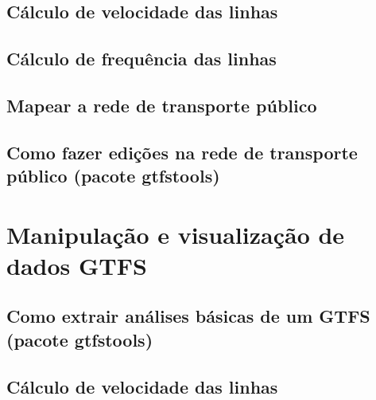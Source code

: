 \documentclass[
  letterpaper,
  DIV=11,
  numbers=noendperiod]{scrreprt}
\begin{document}
\hypertarget{cuxe1lculo-de-velocidade-das-linhas}{%
\section{Cálculo de velocidade das
linhas}\label{cuxe1lculo-de-velocidade-das-linhas}}

\hypertarget{cuxe1lculo-de-frequuxeancia-das-linhas}{%
\section{Cálculo de frequência das
linhas}\label{cuxe1lculo-de-frequuxeancia-das-linhas}}

\hypertarget{mapear-a-rede-de-transporte-puxfablico}{%
\section{Mapear a rede de transporte
público}\label{mapear-a-rede-de-transporte-puxfablico}}

\hypertarget{como-fazer-ediuxe7uxf5es-na-rede-de-transporte-puxfablico-pacote-gtfstools}{%
\section{Como fazer edições na rede de transporte público (pacote
gtfstools)}\label{como-fazer-ediuxe7uxf5es-na-rede-de-transporte-puxfablico-pacote-gtfstools}}

\hypertarget{manipulauxe7uxe3o-e-visualizauxe7uxe3o-de-dados-gtfs}{%
\chapter{Manipulação e visualização de dados
GTFS}\label{manipulauxe7uxe3o-e-visualizauxe7uxe3o-de-dados-gtfs}}

\hypertarget{como-extrair-anuxe1lises-buxe1sicas-de-um-gtfs-pacote-gtfstools-1}{%
\section{Como extrair análises básicas de um GTFS (pacote
gtfstools)}\label{como-extrair-anuxe1lises-buxe1sicas-de-um-gtfs-pacote-gtfstools-1}}

\hypertarget{cuxe1lculo-de-velocidade-das-linhas-1}{%
\section{Cálculo de velocidade das
linhas}\label{cuxe1lculo-de-velocidade-das-linhas-1}}
\end{document}
